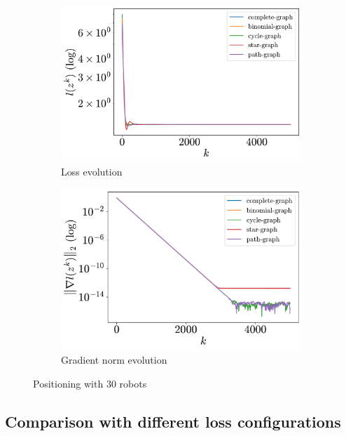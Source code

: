 \documentclass[a4paper,11pt,oneside]{book}
\begin{document}
\begin{figure}[H]
      \centering
      \begin{subfigure}[t]{0.46\linewidth}
            \centering
            \includegraphics[width=\linewidth]{./figs/aggregative/lots_agents/loss.pdf} 
            \caption{Loss evolution}
      \end{subfigure}
      \hfill
      \begin{subfigure}[t]{0.46\linewidth}
            \centering
            \includegraphics[width=\linewidth]{./figs/aggregative/lots_agents/gradient.pdf} 
            \caption{Gradient norm evolution}
      \end{subfigure}
      \caption{Positioning with $30$ robots}
      \label{fig:positioning_30}
\end{figure}



\subsection{Comparison with different loss configurations}
\end{document}
